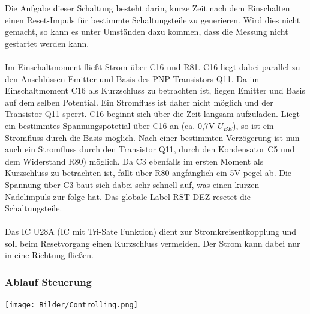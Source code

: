 \documentclass[a4paper,11pt]{scrartcl}
\begin{document}
Die Aufgabe dieser Schaltung besteht darin, kurze Zeit nach dem Einschalten einen Reset-Impuls für bestimmte Schaltungsteile zu generieren. Wird dies nicht gemacht, so kann es unter Umständen dazu kommen, dass die Messung nicht gestartet werden kann.
\\
\\
Im Einschaltmoment fließt Strom über C16 und R81. C16 liegt dabei parallel zu den Anschlüssen \glqq Emitter und Basis\grqq{} des PNP-Transistors Q11. Da im Einschaltmoment C16 als Kurzschluss zu betrachten ist, liegen Emitter und Basis auf dem selben Potential. Ein Stromfluss ist daher nicht möglich und der Transistor Q11 sperrt. C16 beginnt sich über die Zeit langsam aufzuladen. Liegt ein bestimmtes Spannungspotetial über C16 an (ca. 0,7V $U_{BE}$), so ist ein Stromfluss durch die Basis möglich. Nach einer bestimmten Verzögerung ist nun auch ein Stromfluss durch den Transistor Q11, durch den Kondensator C5 und dem Widerstand R80) möglich. Da C3 ebenfalls im ersten Moment als Kurzschluss zu betrachten ist, fällt über R80 angfänglich ein 5V pegel ab. Die Spannung über C3 baut sich dabei sehr schnell auf, was einen kurzen Nadelimpuls zur folge hat. Das globale Label \glqq RST DEZ\grqq{} resetet die Schaltungsteile.  
\\
\\
Das IC U28A (IC mit Tri-Sate Funktion) dient zur Stromkreisentkopplung und soll beim Resetvorgang einen Kurzschluss vermeiden. Der Strom kann dabei nur in eine Richtung fließen.

\newpage
\subsubsection{Ablauf Steuerung}

\begin{center}
\texttt{[image: Bilder/Controlling.png]}
\end{center}
\end{document}
